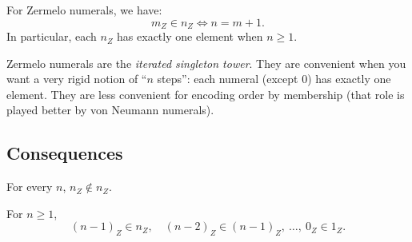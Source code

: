 \begin{proposition}
\label{prop:zermelo-membership}
For Zermelo numerals, we have:
\[
m_Z \in n_Z \iff n = m+1.
\]
In particular, each $n_Z$ has exactly one element when $n\ge 1$.
\end{proposition}



\begin{remark}
Zermelo numerals are the \emph{iterated singleton tower}.
They are convenient when you want a very rigid notion of ``$n$ steps'':
each numeral (except $0$) has exactly one element.
They are less convenient for encoding order by membership (that role is played better by von Neumann numerals).
\end{remark}

\subsection*{Consequences}

\begin{corollary}
\label{cor:zermelo-no-self-membership}
For every $n$, $n_Z \notin n_Z$.
\end{corollary}



\begin{corollary}
\label{cor:zermelo-chain}
For $n\ge 1$,
\[
(n-1)_Z \in n_Z,\quad (n-2)_Z \in (n-1)_Z,\ \dots,\ 0_Z \in 1_Z.
\]
\end{corollary}


